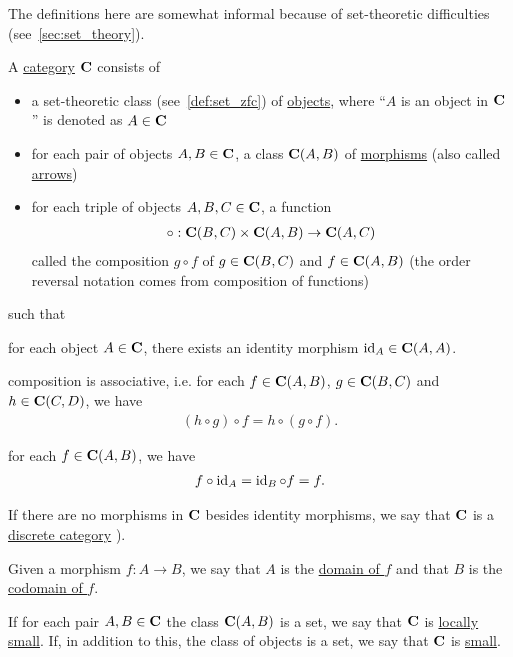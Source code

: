 \begin{note}
  The definitions here are somewhat informal because of set-theoretic difficulties (see~\cref{sec:set_theory}).
\end{note}

\begin{definition}\label{def:category}\cite[definition 1.1.1]{Leinster2014}
  A \uline{category} $\operatorname{\mathbf{C}}$ consists of
  \begin{itemize}
    \item a set-theoretic class (see~\cref{def:set_zfc}) of \uline{objects}, where \enquote{$A$ is an object in $\operatorname{\mathbf{C}}$} is denoted as $A \in \operatorname{\mathbf{C}}$
    \item for each pair of objects $A, B \in \operatorname{\mathbf{C}}$, a class ${\operatorname{\mathbf{C}}}(A, B)$ of \uline{morphisms} (also called \uline{arrows})
    \item for each triple of objects $A, B, C \in \operatorname{\mathbf{C}}$, a function
    \begin{align*}
      \circ: {\operatorname{\mathbf{C}}}(B, C) \times {\operatorname{\mathbf{C}}}(A, B) \to {\operatorname{\mathbf{C}}}(A, C)
    \end{align*}
    called the composition $g \circ f$ of $g \in {\operatorname{\mathbf{C}}}(B, C)$ and $f \in {\operatorname{\mathbf{C}}}(A, B)$ (the order reversal notation comes from composition of functions)
  \end{itemize}
  such that
  \begin{defenum}
    \item for each object $A \in \operatorname{\mathbf{C}}$, there exists an identity morphism $\operatorname{id}_A \in {\operatorname{\mathbf{C}}}(A, A)$.
    \item composition is associative, i.e. for each $f \in {\operatorname{\mathbf{C}}}(A, B)$, $g \in {\operatorname{\mathbf{C}}}(B, C)$ and $h \in {\operatorname{\mathbf{C}}}(C, D)$, we have
    \begin{align*}
      (h \circ g) \circ f = h \circ (g \circ f).
    \end{align*}
    \item for each $f \in {\operatorname{\mathbf{C}}}(A, B)$, we have
    \begin{align*}
      f \circ \operatorname{id}_A = \operatorname{id}_B \circ f = f.
    \end{align*}
  \end{defenum}

  If there are no morphisms in $\operatorname{\mathbf{C}}$ besides identity morphisms, we say that $\operatorname{\mathbf{C}}$ is a \uline{discrete category} \cite[example 1.1.18(b]{Leinster2014}).

  Given a morphism $f: A \to B$, we say that $A$ is the \uline{domain of $f$} and that $B$ is the \uline{codomain of $f$}.

  If for each pair $A, B \in \operatorname{\mathbf{C}}$ the class $\operatorname{\mathbf{C}}(A, B)$ is a set, we say that $\operatorname{\mathbf{C}}$ is \uline{locally small}. If, in addition to this, the class of objects is a set, we say that $\operatorname{\mathbf{C}}$ is \uline{small}.
\end{definition}

